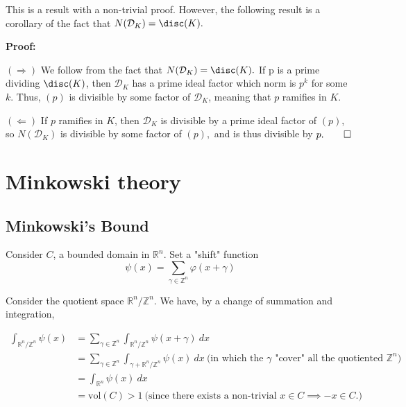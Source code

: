 \documentclass[a4paper, 12pt,oneside,openany]{book}
\begin{document}

This is a result with a non-trivial proof. However, the following result is a corollary of the fact that $N(\mathcal{D}_K)=\disc(K).$


\textbf{Proof:} 

$(\Rightarrow)$ We follow from the fact that $N(\mathcal{D}_K) = \disc(K).$ If p is a prime dividing $\disc(K)$, then $\mathcal{D}_K$ has a prime ideal factor which norm is $p^k$ for some $k$. Thus, $(p)$ is divisible by some factor of $\mathcal{D}_K$, meaning that $p$ ramifies in $K.$

$(\Leftarrow)$ If $p$ ramifies in $K$, then $\mathcal{D}_K$ is divisible by a prime ideal factor of $(p)$, so $N(\mathcal{D}_K)$ is divisible by some factor of $(p),$ and is thus divisible by $p. \qed$   

\chapter{Minkowski theory} \label{ch2}
\minitoc
\section{Minkowski's Bound}


Consider $C$, a bounded domain in $\mathbb{R}^n$. Set a "shift" function $$\psi(x) = \sum\limits_{\gamma \in \mathbb{Z}^n} \varphi(x+\gamma) $$

Consider the quotient space $\mathbb{R}^n / \mathbb{Z}^n.$ We have, by a change of summation and integration,

\begin{align*}
    \int_{\mathbb{R}^n / \mathbb{Z}^n} \psi(x) &= \sum\limits_{\gamma \in \mathbb{Z}^n }\int_{\mathbb{R}^n / \mathbb{Z}^n}\psi(x+\gamma) \ dx \\
    &= \sum\limits_{\gamma \in \mathbb{Z}^n} \int_{\gamma + \mathbb{R}^n / \mathbb{Z}^n} \psi(x) \ dx \ \text{(in which the $\gamma$ "cover" all the quotiented $\mathbb{Z}^n$)} \\ &= \int_{\mathbb{R}^n} \psi(x) \ dx \\ &= \text{vol}(C) > 1 \ \text{(since there exists a non-trivial $x \in C \implies -x \in C.$)}
\end{align*}
\end{document}

